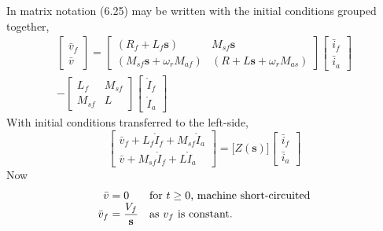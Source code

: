 \documentclass[a4paper,numbers=noenddot,12pt]{scrbook}
\begin{document}
        In matrix notation (6.25) may be written with the initial conditions grouped together,
        \begin{multline}
            \begin{bmatrix}
                \bar v_f \\[2ex] \bar v
            \end{bmatrix} = 
            \begin{bmatrix}
                (R_f + L_f \mathbf{s} ) & M_{sf}\mathbf s  \\[2ex]
                (M_{sf} \mathbf{s} + \omega_r M_{af} ) & (R + L\mathbf{s}+\omega_r M_{as} )
            \end{bmatrix}
            \begin{bmatrix}
                \bar i_f \\[2ex] \bar i_a %
            \end{bmatrix} \\
            - 
            \begin{bmatrix}
                L_f & M_{sf} \\[2ex]
                M_{sf} & L
            \end{bmatrix}
            \begin{bmatrix}
                \mathring I_f \\[2ex] \mathring I_a
            \end{bmatrix}
        \end{multline}
        With initial conditions transferred to the left-side,
        \begin{equation}
            \begin{bmatrix}
                \bar v_f + L_f \mathring I_f + M_{sf} \mathring I_a \\[2ex]
                \bar v + M_{sf} \mathring I_f + L \mathring I_a
            \end{bmatrix}
            =
            \Bigg[ Z(\mathbf s)\Bigg]
            \begin{bmatrix}
                \bar i_f \\[2ex] \bar i_a %
            \end{bmatrix}
            \label{}
        \end{equation}
        Now
        \begin{equation*}
            \begin{array}{r@{\;=\;}ll}
                \bar v & 0 & \text{for } t \geq 0 \text{, machine short-circuited} \\
                \bar v_f & \dfrac{V_f}{\mathbf s} &\text{as } v_f \text{\ is constant.}
            \end{array}
        \end{equation*}
\end{document}
